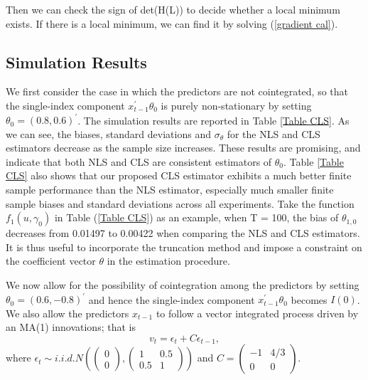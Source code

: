 \documentclass[a4paper,12pt,times,numbered,print,index]{report}
\numberwithin{equation}{section}
\begin{document}
	Then we can check the sign of det(H(L)) to decide whether a local minimum exists. If there is a local minimum, we can find it by solving (\ref{gradient cal}).
	
	
	\subsection{Simulation Results}
	We first consider the case in which the predictors are not cointegrated, so that the single-index component $x_{t-1}^{\prime }\theta _{0}$ is purely non-stationary by setting $\theta_{0} =\left( 0.8,0.6\right) ^{\prime }$. The simulation results are reported in Table \ref{Table CLS}. As we can see, the biases, standard deviations and $\sigma_{\theta}$ for the NLS and CLS estimators decrease as the sample size increases. These results are promising, and indicate that both NLS and CLS are consistent estimators of $\theta _{0}.$ Table \ref{Table CLS} also shows that our proposed CLS estimator exhibits a much better finite sample performance than the NLS estimator, especially much smaller finite sample biases and standard deviations across all experiments. Take the function $f_1(u, \gamma_{0})$ in Table (\ref{Table CLS}) as an example, when T = 100, the bias of $\theta_{1,0}$ decreases from 0.01497 to 0.00422 when comparing the NLS and CLS estimators. It is thus useful to incorporate the truncation method and impose a constraint on the coefficient vector $\theta $ in the estimation procedure. 
	
	We now allow for the possibility of cointegration among the predictors by setting $\theta_{0} =\left( 0.6,-0.8\right) ^{\prime }$ and hence the single-index component $x_{t-1}^{\prime }\theta _{0}$ becomes $I(0)$. We also allow the predictors $x_{t-1}$ to follow a vector integrated process driven by an MA(1) innovations; that is  
	$$v_t = \epsilon_t + C\epsilon_{t-1},$$
	where $\epsilon_{t} \sim i.i.d. N\left(\left(\begin{array}{c}
		0 \\
		0
	\end{array}\right)
	,\left(\begin{array}{cc}1 & 0.5 \\ 0.5 & 1\end{array}\right)\right)$ and $C=\left(\begin{array}{cc} -1  & 4/ 3 \\ 0 & 0\end{array}\right)$. 
	
	
\end{document}
